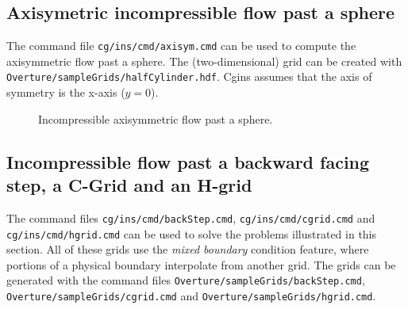 \documentclass{article}
\newcommand{\obFigures}{\homeHenshaw/res/OverBlown/docFigures}  %
\begin{document}
\subsection{Axisymetric incompressible flow past a sphere}

The command file {\tt cg/ins/cmd/axisym.cmd} can be used to compute the axisymmetric
flow past a sphere. The (two-dimensional) grid can be created with  {\tt Overture/\-sampleGrids/\-halfCylinder.hdf}.
Cgins assumes that the axis of symmetry is the x-axis ($y=0$).


{
\begin{figure}[hbt]
\newcommand{\figWidtha}{12.cm}
\newcommand{\trimfiga}[2]{\trimPlot{#1}{#2}{.15}{.15}{.375}{.375}}
\begin{center}
\end{center} 
 \caption{Incompressible axisymmetric flow past a sphere.}
\end{figure}
}


\subsection{Incompressible flow past a backward facing step, a C-Grid and an H-grid}

The command files {\tt cg/ins/cmd/backStep.cmd}, {\tt cg/ins/cmd/cgrid.cmd} and
{\tt cg/ins/cmd/hgrid.cmd} can be used to solve the problems illustrated in this section.
All of these grids use the {\sl mixed boundary} condition feature, where portions of a 
physical boundary interpolate from another grid. The grids can be generated with the command files
{\tt Overture/sampleGrids/backStep.cmd}, {\tt Overture/sampleGrids/cgrid.cmd} and
{\tt Overture/sampleGrids/hgrid.cmd}.
\end{document}
